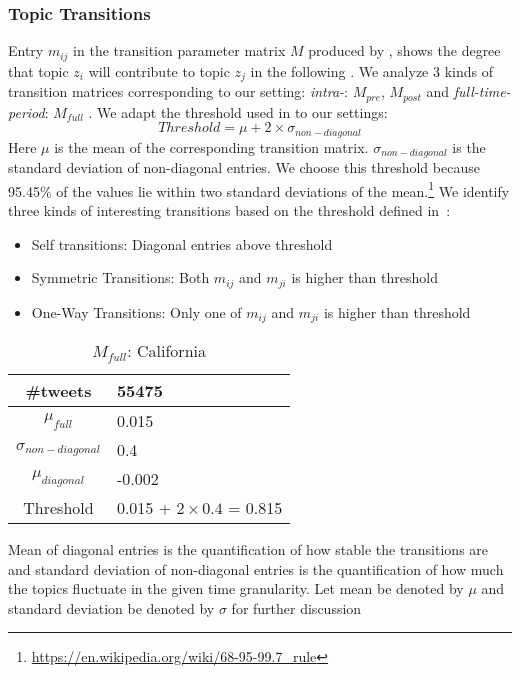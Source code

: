 \subsubsection{Topic Transitions}
Entry $m_{ij}$ in the transition parameter matrix $M$ produced by
\tmatam, shows the degree that topic $z_i$ will contribute to topic $z_j$
in the following \change. We analyze 3 kinds of transition matrices
corresponding to our setting: \textit{intra-\change}: $M_{pre}$, $M_{post}$
and  \textit{full-time-period}: $M_{full}$ .
We adapt the threshold used in \cite{DBLP:conf/kdd/WangAB12} to our settings:
\begin{equation}
Threshold  = \mu + 2\times\sigma_{non-diagonal}
\end{equation}
Here $\mu$ is the mean of the corresponding transition matrix. $\sigma_{non-diagonal}$ is the standard deviation of non-diagonal entries. We choose this threshold because 95.45\% of the values lie within two standard deviations of the mean.\footnote{\url{https://en.wikipedia.org/wiki/68-95-99.7_rule}}
We identify three kinds of 
interesting transitions based on the threshold defined in~\cite{DBLP:conf/kdd/WangAB12}:
\begin{itemize}
 \item Self transitions: Diagonal entries above threshold
 \item Symmetric Transitions: Both $m_{ij}$ and $m_{ji}$ is higher than threshold
 \item One-Way Transitions: Only one of $m_{ij}$ and $m_{ji}$ is higher than threshold
\end{itemize}
\begin{table}[t!]
\centering
\caption{$M_{full}$: California}
\label{tab:statsCalifornia}
\begin{tabular}{|c|l|} \hline
\#tweets & 55475 \\ \hline
$\mu_{full}$ & 0.015\\ \hline
$\sigma_{non-diagonal}$& 0.4\\ \hline
$\mu_{diagonal}$ & -0.002 \\ \hline
Threshold & 0.015 + $2\times0.4$ = 0.815 \\ 
 \hline\end{tabular}
\end{table}
Mean of diagonal entries is the quantification of how stable the 
transitions are and standard deviation of non-diagonal entries is 
the quantification of how much the topics fluctuate in the given 
time granularity. Let mean be denoted by $\mu$ and standard deviation 
be denoted by $\sigma$ for further discussion
